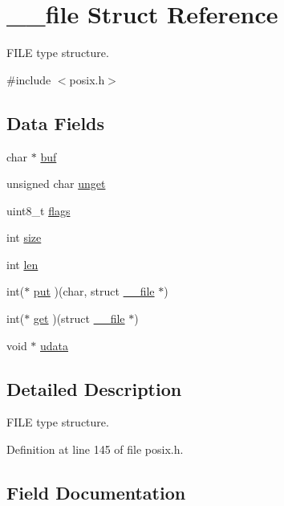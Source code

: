 \hypertarget{struct____file}{}\section{\+\_\+\+\_\+file Struct Reference}
\label{struct____file}


F\+I\+LE type structure.  




{\ttfamily \#include $<$posix.\+h$>$}

\subsection*{Data Fields}
\begin{DoxyCompactItemize}
\item 
char $\ast$ \hyperlink{struct____file_a3e5a85ae919a90efbb7cb44ccb54fe46}{buf}
\item 
unsigned char \hyperlink{struct____file_a1d139ae3cb11a1fada469a49f7d3d3b6}{unget}
\item 
uint8\+\_\+t \hyperlink{struct____file_a8d11df8679502efee09740f97d7c277b}{flags}
\item 
int \hyperlink{struct____file_aff4a1ca8b6a12460812928afae81248d}{size}
\item 
int \hyperlink{struct____file_a30309efd13a75ed510bb2370debafaf8}{len}
\item 
int($\ast$ \hyperlink{struct____file_a01c8b217e42cc11b6a7f8429114e9d46}{put} )(char, struct \hyperlink{struct____file}{\+\_\+\+\_\+file} $\ast$)
\item 
int($\ast$ \hyperlink{struct____file_a2d816b077c3af0425344fe4b283dad33}{get} )(struct \hyperlink{struct____file}{\+\_\+\+\_\+file} $\ast$)
\item 
void $\ast$ \hyperlink{struct____file_abe6f3bdb4df4119277132eb3e13a4628}{udata}
\end{DoxyCompactItemize}


\subsection{Detailed Description}
F\+I\+LE type structure. 

Definition at line 145 of file posix.\+h.



\subsection{Field Documentation}
